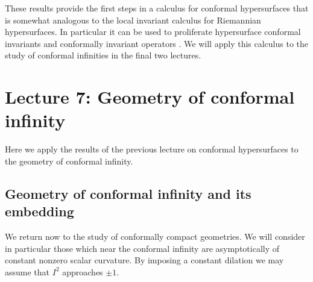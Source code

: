 \documentclass[a4paper,12pt]{amsart}
\theoremstyle{remark}
\begin{document}
These results provide the first steps in a calculus for conformal
hypersurfaces that is somewhat analogous to the local invariant
calculus for Riemannian hypersurfaces. In particular it can be used to
proliferate hypersurface conformal invariants and conformally
invariant operators \cite{YuriTh,GoY}. We will apply this calculus to the study of conformal infinities in the final two lectures.










\section{Lecture 7:  Geometry of conformal infinity}

Here we apply the results of the previous lecture on conformal hypersurfaces to the geometry of conformal infinity.

\subsection{Geometry of conformal infinity and its embedding}

We return now to the study of conformally compact geometries. We will consider in particular those which near the conformal infinity are asymptotically of constant nonzero scalar curvature. By imposing a constant dilation we may assume that $I^2$ approaches $\pm 1$. 
\end{document}
